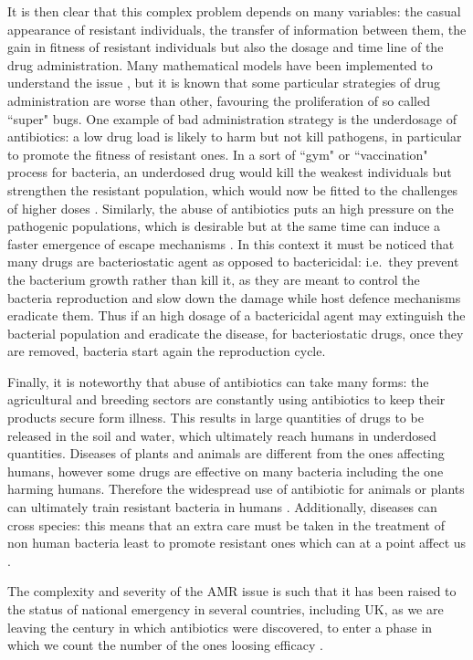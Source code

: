 It is then clear that this complex problem depends on many variables: the casual appearance of resistant individuals, the transfer of information between them, the gain in fitness of resistant individuals but also the dosage and time line of the drug administration. Many mathematical models have been implemented to understand the issue \cite{Birkegard2018,Niewiadomska2019}, but it is known that some particular strategies of drug administration are worse than other, favouring the proliferation of so called ``super" bugs.
%
One example of bad administration strategy is the underdosage of antibiotics: a low drug load is likely to harm but not kill pathogens, in particular to promote the fitness of resistant ones. In a sort of ``gym" or ``vaccination" process for bacteria, an underdosed drug would kill the weakest individuals but strengthen the resistant population, which would now be fitted to the challenges of higher doses \cite{????}.
%
Similarly, the abuse of antibiotics puts an high pressure on the pathogenic populations, which is desirable but at the same time can induce a faster emergence of escape mechanisms \cite{????}.
%
In this context it must be noticed that many drugs are bacteriostatic agent as opposed to bactericidal: i.e.\ they prevent the bacterium growth rather than kill it, as they are meant to control the bacteria reproduction and slow down the damage while host defence mechanisms eradicate them.
%
Thus if an high dosage of a bactericidal agent may extinguish the bacterial population and eradicate the disease, for bacteriostatic drugs, once they are removed, bacteria start again the reproduction cycle.

Finally, it is noteworthy that abuse of antibiotics can take many forms: the agricultural and breeding sectors are constantly using antibiotics to keep their products secure form illness. This results in large quantities of drugs to be released in the soil and water, which ultimately reach humans in underdosed quantities. Diseases of plants and animals are different from the ones affecting humans, however some drugs are effective on many bacteria including the one harming humans. Therefore the widespread use of antibiotic for animals or plants can ultimately train resistant bacteria in humans \cite{????}.
%
Additionally, diseases can cross species: this means that an extra care must be taken in the treatment of non human bacteria least to promote resistant ones which can at a point affect us \cite{????}.

The complexity and severity of the AMR issue is such that it has been raised to the status of national emergency in several countries, including UK, as we are leaving the century in which antibiotics were discovered, to enter a phase in which we count the number of the ones loosing efficacy \cite{Oneill2016}.


